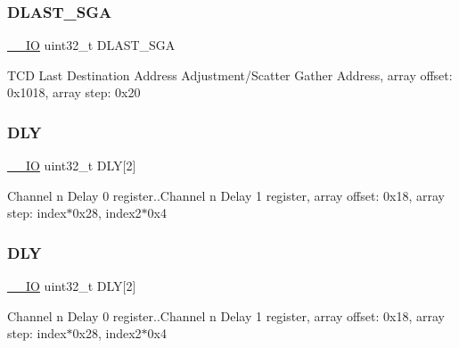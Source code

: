 \subsubsection{\texorpdfstring{D\+L\+A\+S\+T\+\_\+\+S\+GA}{DLAST\_SGA}\hspace{0.1cm}{\footnotesize\ttfamily [2/2]}}
{\footnotesize\ttfamily \mbox{\hyperlink{core__cm4_8h_aec43007d9998a0a0e01faede4133d6be}{\+\_\+\+\_\+\+IO}} uint32\+\_\+t D\+L\+A\+S\+T\+\_\+\+S\+GA}

T\+CD Last Destination Address Adjustment/\+Scatter Gather Address, array offset\+: 0x1018, array step\+: 0x20 \mbox{\label{group___v_r_e_f___peripheral___access___layer_ga826415186f68fa272f4659ba9af7c392}} 
\subsubsection{\texorpdfstring{D\+LY}{DLY}\hspace{0.1cm}{\footnotesize\ttfamily [1/2]}}
{\footnotesize\ttfamily \mbox{\hyperlink{core__cm4_8h_aec43007d9998a0a0e01faede4133d6be}{\+\_\+\+\_\+\+IO}} uint32\+\_\+t D\+LY\mbox{[}2\mbox{]}}

Channel n Delay 0 register..Channel n Delay 1 register, array offset\+: 0x18, array step\+: index$\ast$0x28, index2$\ast$0x4 \mbox{\label{group___v_r_e_f___peripheral___access___layer_ga826415186f68fa272f4659ba9af7c392}} 
\subsubsection{\texorpdfstring{D\+LY}{DLY}\hspace{0.1cm}{\footnotesize\ttfamily [2/2]}}
{\footnotesize\ttfamily \mbox{\hyperlink{core__cm4_8h_aec43007d9998a0a0e01faede4133d6be}{\+\_\+\+\_\+\+IO}} uint32\+\_\+t D\+LY\mbox{[}2\mbox{]}}

Channel n Delay 0 register..Channel n Delay 1 register, array offset\+: 0x18, array step\+: index$\ast$0x28, index2$\ast$0x4 \mbox{\label{group___v_r_e_f___peripheral___access___layer_ga87df1a716c395b3f3474710e434e41dc}} 
